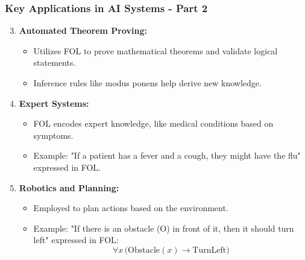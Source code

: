 \documentclass[aspectratio=169]{beamer}
\begin{document}
\begin{frame}[fragile]
    \frametitle{Key Applications in AI Systems - Part 2}
    \begin{enumerate}
        \setcounter{enumi}{2}
        \item \textbf{Automated Theorem Proving:}
            \begin{itemize}
                \item Utilizes FOL to prove mathematical theorems and validate logical statements.
                \item Inference rules like modus ponens help derive new knowledge.
            \end{itemize}

        \item \textbf{Expert Systems:}
            \begin{itemize}
                \item FOL encodes expert knowledge, like medical conditions based on symptoms.
                \item Example: "If a patient has a fever and a cough, they might have the flu" expressed in FOL.
            \end{itemize}
        
        \item \textbf{Robotics and Planning:}
            \begin{itemize}
                \item Employed to plan actions based on the environment.
                \item Example: "If there is an obstacle (O) in front of it, then it should turn left" expressed in FOL:
                \begin{equation}
                    \forall x \, \text{(Obstacle}(x) \rightarrow \text{TurnLeft)}
                \end{equation}
            \end{itemize}
    \end{enumerate}
\end{frame}
\end{document}
